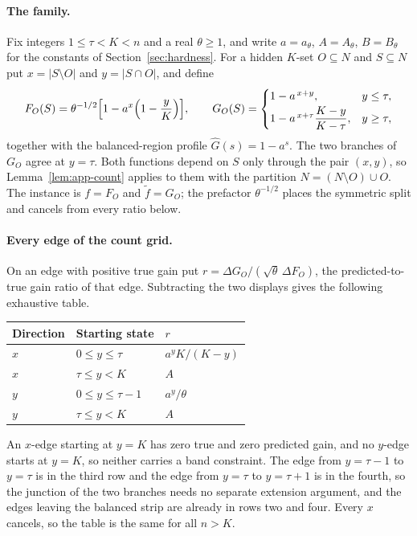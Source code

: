 \paragraph{The family.}
Fix integers $1\le\tau<K<n$ and a real $\theta\ge1$, and write $a=a_\theta$,
$A=A_\theta$, $B=B_\theta$ for the constants of Section~\ref{sec:hardness}.
For a hidden $K$-set $O\subseteq N$ and $S\subseteq N$ put $x=|S\setminus O|$
and $y=|S\cap O|$, and define
\[
  F_O(S)=\theta^{-1/2}\Bigl[1-a^{x}\Bigl(1-\frac yK\Bigr)\Bigr],
  \qquad
  G_O(S)=\begin{cases}
    1-a^{\,x+y}, & y\le\tau,\\[2pt]
    1-a^{\,x+\tau}\dfrac{K-y}{K-\tau}, & y\ge\tau,
  \end{cases}
\]
together with the balanced-region profile $\hat G(s)=1-a^{s}$.  The two
branches of $G_O$ agree at $y=\tau$.  Both functions depend on $S$ only
through the pair $(x,y)$, so Lemma~\ref{lem:app-count} applies to them with
the partition $N=(N\setminus O)\cup O$.  The instance is $f=F_O$ and
$\tilde f=G_O$; the prefactor $\theta^{-1/2}$ places the symmetric split and
cancels from every ratio below.

\paragraph{Every edge of the count grid.}
On an edge with positive true gain put
$r=\Delta G_O/(\sqrt\theta\,\Delta F_O)$, the predicted-to-true gain ratio of
that edge.  Subtracting the two displays gives the following exhaustive table.
\begin{center}
\begin{tabular}{lll}
\toprule
Direction & Starting state & $r$ \\
\midrule
$x$ & $0\le y\le\tau$ & $a^{y}K/(K-y)$ \\
$x$ & $\tau\le y<K$   & $A$ \\
$y$ & $0\le y\le\tau-1$ & $a^{y}/\theta$ \\
$y$ & $\tau\le y<K$   & $A$ \\
\bottomrule
\end{tabular}
\end{center}
An $x$-edge starting at $y=K$ has zero true and zero predicted gain, and no
$y$-edge starts at $y=K$, so neither carries a band constraint.  The edge from
$y=\tau-1$ to $y=\tau$ is in the third row and the edge from $y=\tau$ to
$y=\tau+1$ is in the fourth, so the junction of the two branches needs no
separate extension argument, and the edges leaving the balanced strip are
already in rows two and four.  Every $x$ cancels, so the table is the same for
all $n>K$.

